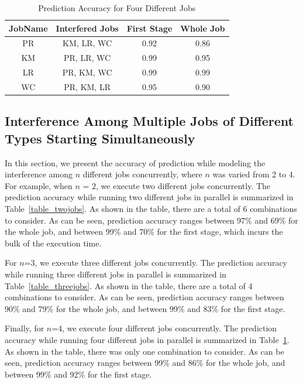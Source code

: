 \begin{table}[!htb]
\renewcommand{\arraystretch}{1.3}
\caption{Prediction Accuracy for Four Different Jobs}
\label{table_fourjobs}
\centering
\begin{tabular}{c|c|c|c}
\hline
\bfseries JobName & \bfseries Interfered Jobs & \bfseries First Stage & \bfseries Whole Job\\
\hline\hline
PR & KM, LR, WC & 0.92 & 0.86\\
\hline
KM & PR, LR, WC & 0.99 & 0.95\\
\hline
LR & PR, KM, WC & 0.99 & 0.99 \\
\hline
WC & PR, KM, LR & 0.95 & 0.90\\
\hline
\end{tabular}
\end{table}


\subsection{Interference Among Multiple Jobs of Different Types Starting Simultaneously}
\noindent
In this section, we present the accuracy of prediction while modeling the interference among $n$ different jobs concurrently, where $n$ was varied from 2 to 4. For example, when $n$ = 2, we execute two different jobs concurrently. The prediction accuracy while running two different jobs in parallel is summarized in Table~\ref{table_twojobs}. As shown in the table, there are a total of 6 combinations to consider. As can be seen, prediction accuracy ranges between 97\% and 69\% for the whole job, and between 99\% and 70\% for the first stage, which incurs the bulk of the execution time. 

\noindent
For $n$=3, we execute three different jobs concurrently. The prediction accuracy while running three different jobs in parallel is summarized in Table~\ref{table_threejobs}. As shown in the table, there are a total of 4 combinations to consider. As can be seen, prediction accuracy ranges between 90\% and 79\% for the whole job, and between 99\% and 83\% for the first stage.

\noindent
Finally, for $n$=4, we execute four different jobs concurrently. The prediction accuracy while running four different jobs in parallel is summarized in Table~\ref{table_fourjobs}. As shown in the table, there was only one combination to consider. As can be seen, prediction accuracy ranges between 99\% and 86\% for the whole job, and between 99\% and 92\% for the first stage.














